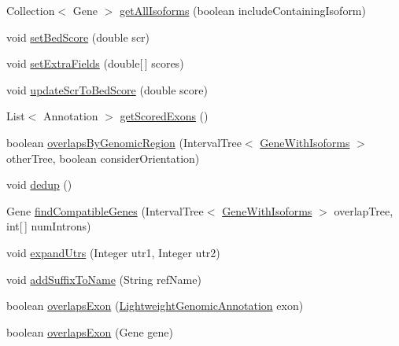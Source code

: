 \begin{DoxyCompactItemize}
\item 
Collection$<$ Gene $>$ \hyperlink{classbroad_1_1pda_1_1gene_1_1_gene_with_isoforms_a7a7793292c5d511b1ba638194d66b21f}{get\+All\+Isoforms} (boolean include\+Containing\+Isoform)
\item 
void \hyperlink{classbroad_1_1pda_1_1gene_1_1_gene_with_isoforms_a29d8e059388d8c9aff14ebe5d9e66702}{set\+Bed\+Score} (double scr)
\item 
void \hyperlink{classbroad_1_1pda_1_1gene_1_1_gene_with_isoforms_a46a36daba673685dc1948a32e7d12935}{set\+Extra\+Fields} (double\mbox{[}$\,$\mbox{]} scores)
\item 
void \hyperlink{classbroad_1_1pda_1_1gene_1_1_gene_with_isoforms_aa630ac0b82bb26c3c9adce7de2e021c0}{update\+Scr\+To\+Bed\+Score} (double score)
\item 
List$<$ Annotation $>$ \hyperlink{classbroad_1_1pda_1_1gene_1_1_gene_with_isoforms_a2338d4fc34ef3ca18b07870da25e8b4b}{get\+Scored\+Exons} ()
\item 
boolean \hyperlink{classbroad_1_1pda_1_1gene_1_1_gene_with_isoforms_aa7df0b4b64b4537f2161246df97689ce}{overlaps\+By\+Genomic\+Region} (Interval\+Tree$<$ \hyperlink{classbroad_1_1pda_1_1gene_1_1_gene_with_isoforms}{Gene\+With\+Isoforms} $>$ other\+Tree, boolean consider\+Orientation)
\item 
void \hyperlink{classbroad_1_1pda_1_1gene_1_1_gene_with_isoforms_a1200ceeb5062d7daad6f259b91bef0ce}{dedup} ()
\item 
Gene \hyperlink{classbroad_1_1pda_1_1gene_1_1_gene_with_isoforms_addd04bdda459c3a718fd91bfcbf72834}{find\+Compatible\+Genes} (Interval\+Tree$<$ \hyperlink{classbroad_1_1pda_1_1gene_1_1_gene_with_isoforms}{Gene\+With\+Isoforms} $>$ overlap\+Tree, int\mbox{[}$\,$\mbox{]} num\+Introns)
\item 
void \hyperlink{classbroad_1_1pda_1_1gene_1_1_gene_with_isoforms_a22ce4eb354fce7e5375dd46ddce43219}{expand\+Utrs} (Integer utr1, Integer utr2)
\item 
void \hyperlink{classbroad_1_1pda_1_1gene_1_1_gene_with_isoforms_afa314da5ce810a1c42f2a5ec47378819}{add\+Suffix\+To\+Name} (String ref\+Name)
\item 
boolean \hyperlink{classbroad_1_1pda_1_1gene_1_1_gene_with_isoforms_a388a066aa0310b7184d815bc843975da}{overlaps\+Exon} (\hyperlink{interfacebroad_1_1core_1_1annotation_1_1_lightweight_genomic_annotation}{Lightweight\+Genomic\+Annotation} exon)
\item 
boolean \hyperlink{classbroad_1_1pda_1_1gene_1_1_gene_with_isoforms_a059225a21c9eb54e99eb80ede0173c20}{overlaps\+Exon} (Gene gene)

\end{DoxyCompactItemize}
